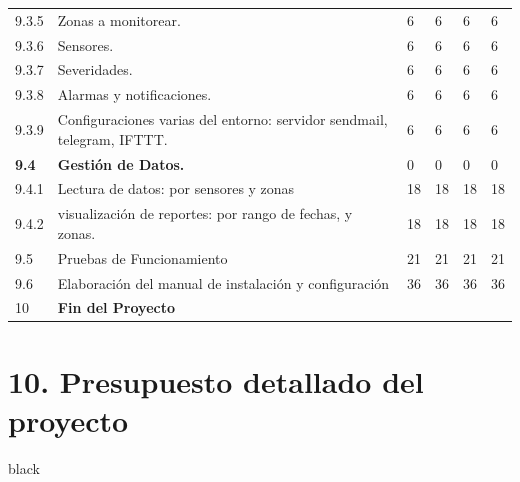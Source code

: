 \documentclass[11pt]{charter}
\begin{document}
\begin{landscape}
\begin{tabularx}{\linewidth}{@{}|p{2cm}|p{11cm}|p{2.4cm}|p{2.4cm}|p{2.4cm}|p{2.4cm}|@{}}
9.3.5          & Zonas a monitorear.                                                                           & 6    & 6    & 6    & 6    \\
9.3.6          & Sensores.                                                                                     & 6    & 6    & 6    & 6    \\
9.3.7          & Severidades.                                                                                  & 6    & 6    & 6    & 6    \\
9.3.8          & Alarmas y notificaciones.                                                                     & 6    & 6    & 6    & 6    \\
9.3.9          & Configuraciones varias del   entorno: servidor sendmail, telegram, IFTTT.                     & 6    & 6    & 6    & 6    \\
\textbf{9.4}   & \textbf{Gestión de Datos.}                                                                    & 0    & 0    & 0    & 0    \\
9.4.1          & Lectura de datos: por sensores y   zonas                                                      & 18   & 18   & 18   & 18   \\
9.4.2          & visualización de reportes: por   rango de fechas,  y zonas.                                   & 18   & 18   & 18   & 18   \\
9.5            & Pruebas de Funcionamiento                                                                     & 21   & 21   & 21   & 21   \\
9.6            & Elaboración del manual de   instalación y configuración                                       & 36   & 36   & 36   & 36   \\
10             & \textbf{Fin del Proyecto}                                                                     &      &      &      &  

\end{tabularx}
\end{landscape}


\section{10. Presupuesto detallado del proyecto}
\label{sec:presupuesto}

\begin{consigna}{black}
%

\end{consigna}
\end{document}
